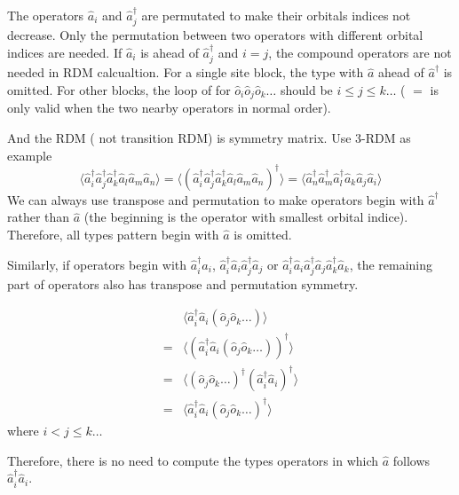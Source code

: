 The operators $\hat{a}_i$ and $\hat{a}^\dagger_j$ are permutated to make their orbitals indices not decrease. Only the permutation between two operators with different orbital indices are needed.
If $\hat{a}_i$ is ahead of $\hat{a}^\dagger_j$ and $i=j$, the compound operators are not needed in RDM calcualtion. For a single site block, the type with $\hat{a}$ ahead of $\hat{a}^\dagger$ is omitted. For other blocks, the loop of for $\hat{o}_i\hat{o}_j\hat{o}_k\dots$ should be $i \le j \le k\dots$ ( $=$ is only valid when the two nearby operators in normal order). 


And the RDM ( not transition RDM) is symmetry matrix. Use 3-RDM as example 
\begin{equation}
  \langle \hat{a}_i^\dagger\hat{a}_j^\dagger\hat{a}^\dagger_k\hat{a}_l\hat{a}_m\hat{a}_n\rangle = \langle(\hat{a}_i^\dagger\hat{a}_j^\dagger\hat{a}^\dagger_k\hat{a}_l\hat{a}_m\hat{a}_n)^\dagger\rangle
  = \langle \hat{a}_n^\dagger\hat{a}_m^\dagger\hat{a}_l^\dagger\hat{a}_k\hat{a}_j\hat{a}_i\rangle
\end{equation}
We can always use transpose and permutation to make operators begin with $\hat{a}^\dagger$ rather than $\hat{a}$ (the beginning is the operator with smallest orbital indice). Therefore, all types pattern begin with $\hat{a}$ is omitted. 

Similarly, if operators begin with $\hat{a}^\dagger_i\hat{a}_i$, $\hat{a}^\dagger_i\hat{a}_i\hat{a}^\dagger_j\hat{a}_j$ or $\hat{a}^\dagger_i\hat{a}_i\hat{a}^\dagger_j\hat{a}_j\hat{a}^\dagger_k\hat{a}_k$, the remaining part of operators also has transpose and permutation symmetry.

\begin{equation}
\begin{aligned}
  &\langle\hat{a}^\dagger_i\hat{a}_i(\hat{o}_j \hat{o}_k\dots)\rangle \\
  = &\langle(\hat{a}^\dagger_i\hat{a}_i (\hat{o}_j \hat{o}_k\dots))^\dagger\rangle \\
  = &\langle(\hat{o}_j \hat{o}_k\dots)^\dagger(\hat{a}^\dagger_i\hat{a}_i)^\dagger\rangle \\
  = &\langle\hat{a}^\dagger_i\hat{a}_i(\hat{o}_j \hat{o}_k\dots)^\dagger\rangle
\end{aligned}
\end{equation}
where $i < j\le k\dots$

Therefore, there is no need to compute the types operators in which $\hat{a}$ follows $\hat{a}^\dagger_i\hat{a}_i$.

